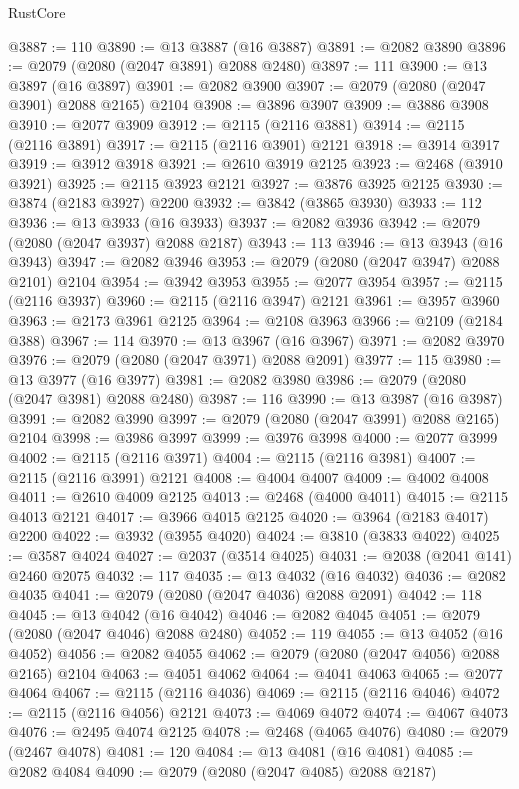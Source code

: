 \begin{lexlean}{RustCore}
\begin{coremodule}
@3887 := 110
@3890 := @13 @3887 (@16 @3887)
@3891 := @2082 @3890
@3896 := @2079 (@2080 (@2047 @3891) @2088 @2480)
@3897 := 111
@3900 := @13 @3897 (@16 @3897)
@3901 := @2082 @3900
@3907 := @2079 (@2080 (@2047 @3901) @2088 @2165) @2104
@3908 := @3896 @3907
@3909 := @3886 @3908
@3910 := @2077 @3909
@3912 := @2115 (@2116 @3881)
@3914 := @2115 (@2116 @3891)
@3917 := @2115 (@2116 @3901) @2121
@3918 := @3914 @3917
@3919 := @3912 @3918
@3921 := @2610 @3919 @2125
@3923 := @2468 (@3910 @3921)
@3925 := @2115 @3923 @2121
@3927 := @3876 @3925 @2125
@3930 := @3874 (@2183 @3927) @2200
@3932 := @3842 (@3865 @3930)
@3933 := 112
@3936 := @13 @3933 (@16 @3933)
@3937 := @2082 @3936
@3942 := @2079 (@2080 (@2047 @3937) @2088 @2187)
@3943 := 113
@3946 := @13 @3943 (@16 @3943)
@3947 := @2082 @3946
@3953 := @2079 (@2080 (@2047 @3947) @2088 @2101) @2104
@3954 := @3942 @3953
@3955 := @2077 @3954
@3957 := @2115 (@2116 @3937)
@3960 := @2115 (@2116 @3947) @2121
@3961 := @3957 @3960
@3963 := @2173 @3961 @2125
@3964 := @2108 @3963
@3966 := @2109 (@2184 @388)
@3967 := 114
@3970 := @13 @3967 (@16 @3967)
@3971 := @2082 @3970
@3976 := @2079 (@2080 (@2047 @3971) @2088 @2091)
@3977 := 115
@3980 := @13 @3977 (@16 @3977)
@3981 := @2082 @3980
@3986 := @2079 (@2080 (@2047 @3981) @2088 @2480)
@3987 := 116
@3990 := @13 @3987 (@16 @3987)
@3991 := @2082 @3990
@3997 := @2079 (@2080 (@2047 @3991) @2088 @2165) @2104
@3998 := @3986 @3997
@3999 := @3976 @3998
@4000 := @2077 @3999
@4002 := @2115 (@2116 @3971)
@4004 := @2115 (@2116 @3981)
@4007 := @2115 (@2116 @3991) @2121
@4008 := @4004 @4007
@4009 := @4002 @4008
@4011 := @2610 @4009 @2125
@4013 := @2468 (@4000 @4011)
@4015 := @2115 @4013 @2121
@4017 := @3966 @4015 @2125
@4020 := @3964 (@2183 @4017) @2200
@4022 := @3932 (@3955 @4020)
@4024 := @3810 (@3833 @4022)
@4025 := @3587 @4024
@4027 := @2037 (@3514 @4025)
@4031 := @2038 (@2041 @141) @2460 @2075
@4032 := 117
@4035 := @13 @4032 (@16 @4032)
@4036 := @2082 @4035
@4041 := @2079 (@2080 (@2047 @4036) @2088 @2091)
@4042 := 118
@4045 := @13 @4042 (@16 @4042)
@4046 := @2082 @4045
@4051 := @2079 (@2080 (@2047 @4046) @2088 @2480)
@4052 := 119
@4055 := @13 @4052 (@16 @4052)
@4056 := @2082 @4055
@4062 := @2079 (@2080 (@2047 @4056) @2088 @2165) @2104
@4063 := @4051 @4062
@4064 := @4041 @4063
@4065 := @2077 @4064
@4067 := @2115 (@2116 @4036)
@4069 := @2115 (@2116 @4046)
@4072 := @2115 (@2116 @4056) @2121
@4073 := @4069 @4072
@4074 := @4067 @4073
@4076 := @2495 @4074 @2125
@4078 := @2468 (@4065 @4076)
@4080 := @2079 (@2467 @4078)
@4081 := 120
@4084 := @13 @4081 (@16 @4081)
@4085 := @2082 @4084
@4090 := @2079 (@2080 (@2047 @4085) @2088 @2187)

\end{coremodule}
\end{lexlean}
